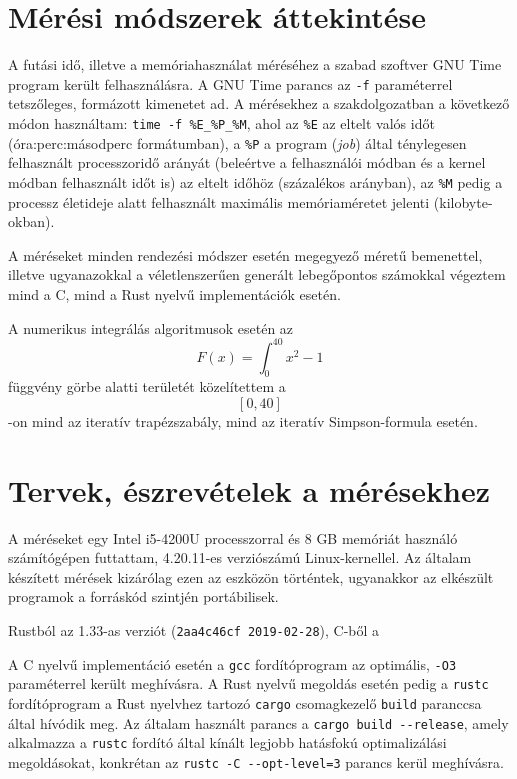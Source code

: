 

\section{Mérési módszerek áttekintése}

A futási idő, illetve a memóriahasználat méréséhez a szabad szoftver GNU Time program került felhasználásra. A GNU Time parancs az \lstinline{-f} paraméterrel tetszőleges, formázott kimenetet ad. A mérésekhez a szakdolgozatban a következő módon használtam: \lstinline{time -f %E_%P_%M}, ahol az \lstinline{%E} az eltelt valós időt (óra:perc:másodperc formátumban), a \lstinline{%P} a program (\textit{job}) által ténylegesen felhasznált processzoridő arányát (beleértve a felhasználói módban és a kernel módban felhasznált időt is) az eltelt időhöz (százalékos arányban), az \lstinline{%M} pedig a processz életideje alatt felhasznált maximális memóriaméretet jelenti (kilobyte-okban).

A méréseket minden rendezési módszer esetén megegyező méretű bemenettel, illetve ugyanazokkal a véletlenszerűen generált lebegőpontos számokkal végeztem mind a C, mind a Rust nyelvű implementációk esetén.

A numerikus integrálás algoritmusok esetén az \[ F(x) = \int_0^{40} x^2 - 1 \] függvény görbe alatti területét közelítettem a \[\left[0, 40\right]\]-on mind az iteratív trapézszabály, mind az iteratív Simpson-formula esetén.

\section{Tervek, észrevételek a mérésekhez}

A méréseket egy Intel i5-4200U processzorral és 8 GB memóriát használó számítógépen futtattam, 4.20.11-es verziószámú Linux-kernellel. Az általam készített mérések kizárólag ezen az eszközön történtek, ugyanakkor az elkészült programok a forráskód szintjén portábilisek.

Rustból az 1.33-as verziót (\lstinline{2aa4c46cf 2019-02-28}), C-ből a 

A C nyelvű implementáció esetén a \lstinline{gcc} fordítóprogram az optimális, \lstinline{-O3} paraméterrel került meghívásra. A Rust nyelvű megoldás esetén pedig a \lstinline{rustc} fordítóprogram a Rust nyelvhez tartozó \lstinline{cargo} csomagkezelő \lstinline{build} paranccsa által hívódik meg. Az általam használt parancs a \lstinline{cargo build --release}, amely alkalmazza a \lstinline{rustc} fordító által kínált legjobb hatásfokú optimalizálási megoldásokat, konkrétan az \lstinline{rustc -C --opt-level=3} parancs kerül meghívásra.
